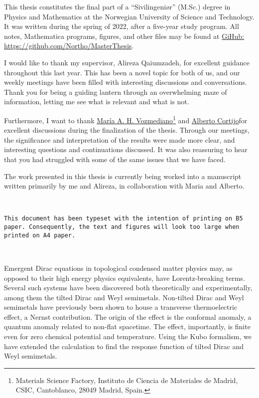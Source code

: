 This thesis constitutes the final part of a ``Sivilingeniør'' (M.Sc.) degree in Physics and Mathematics at the Norwegian University of Science and Technology.
It was written during the spring of 2022, after a five-year study program.
All notes, Mathematica programs, figures, and other files may be found at \href{https://github.com/Northo/MasterThesis}{\textsf{GiHub: https://github.com/Northo/MasterThesis}}.%

I would like to thank my supervisor, Alireza Qaiumzadeh, for excellent guidance throughout this last year.
This has been a novel topic for both of us, and our weekly meetings have been filled with interesting discussions and conversations.
Thank you for being a guiding lantern through an overwhelming maze of information, letting me see what is relevant and what is not.

Furthermore, I want to thank
\href{https://wp.icmm.csic.es/field-theories-in-condensed-matter-physics/vozmediano/}{María A. H. Vozmediano}\footnote{Materials Science Factory, Instituto de Ciencia de Materiales de Madrid, CSIC, Cantoblanco, 28049 Madrid, Spain\label{address-of-spain}.}
and
\href{https://wp.icmm.csic.es/field-theories-in-condensed-matter-physics/alberto-cortijo/}{Alberto Cortijo}\footnotemark[1]
for excellent discussions during the finalization of the thesis.
Through our meetings, the significance and interpretation of the results were made more clear, and interesting questions and continuations discussed.
It was also reassuring to hear that you had struggled with some of the same issues that we have faced.

The work presented in this thesis is currently being worked into a manuscript written primarily by me and Alireza, in collaboration with Maria and Alberto.


{
  \vfill
  \centering
  \color{black!80}
  \hrulefill\bigskip\\
  \parbox{0.84\textwidth}{
    \centering
    \texttt{This document has been typeset with the intention of printing on B5 paper. Consequently, the text and figures will look too large when printed on A4 paper.}
  }\\
  \bigskip\smallskip\hrulefill
  \vfill
}

Emergent Dirac equations in topological condensed matter physics may, as opposed to their high energy physics equivalents, have Lorentz-breaking terms.
Several such systems have been discovered both theoretically and experimentally, among them the tilted Dirac and Weyl semimetals.
Non-tilted Dirac and Weyl semimetals have previously been shown to house a transverse thermoelectric effect, a Nernst contribution.
The origin of the effect is the conformal anomaly, a quantum anomaly related to non-flat spacetime.
The effect, importantly, is finite even for zero chemical potential and temperature.
Using the Kubo formalism, we have extended the calculation to find the response function of tilted Dirac and Weyl semimetals.

